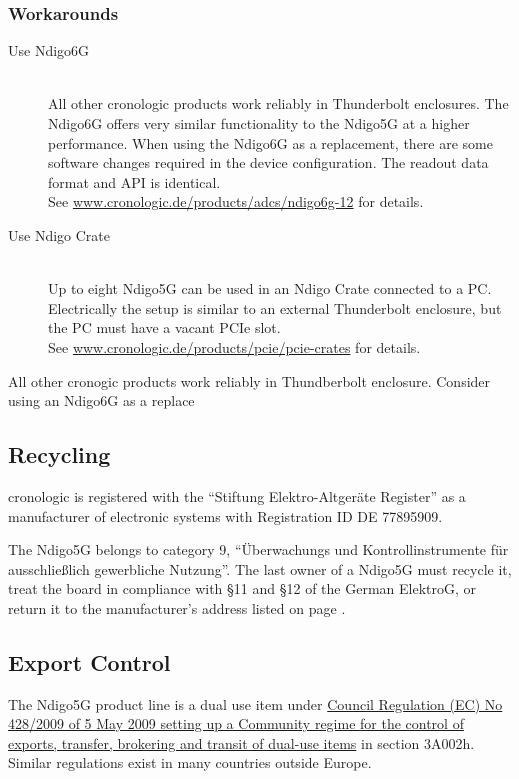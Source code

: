 	\subsubsection{Workarounds}
	\begin{description}
		\item[Use Ndigo6G]\hfill \\
			All other cronologic products work reliably in Thunderbolt enclosures. The Ndigo6G offers very similar functionality to the Ndigo5G at a higher performance. When using the Ndigo6G as a replacement, there are some software changes required in the device configuration. The readout data format and API is identical.\\
			See \href{https://www.cronologic.de/products/adcs/ndigo6g-12}{www.cronologic.de/products/adcs/ndigo6g-12} for details.
 
		\item[Use Ndigo Crate]\hfill \\
			Up to eight Ndigo5G can be used in an Ndigo Crate connected to a PC. Electrically the setup is similar to an external Thunderbolt enclosure, but the PC must have a vacant PCIe slot. \\
			See \href{https://www.cronologic.de/products/pcie/pcie-crates}{www.cronologic.de/products/pcie/pcie-crates} for details.
	\end{description}
	All other cronogic products work reliably in Thundberbolt enclosure. Consider using an Ndigo6G as a replace 

\subsection{Recycling}

	cronologic is registered with the ``Stiftung Elektro-Altger\"a{}te Register'' as a manufacturer of electronic systems with Registration ID DE 77895909.\par

	The Ndigo5G belongs to category 9, ``\"U{}berwachungs und Kontrollinstrumente f\"u{}r aus\-schlie\ss lich gewerbliche Nutzung''. The last owner of a Ndigo5G must recycle it, treat the board in compliance with \S{}11 and \S{}12 of the German ElektroG, or return it to the manufacturer's address listed on page \pageref{cp:manu}.
	
\subsection{Export Control}
The Ndigo5G product line is a dual use item under \href{https://data.europa.eu/eli/reg/2009/428/2021-10-077}{Council Regulation (EC) No 428/2009 of 5 May 2009 setting up a Community regime for the control of exports, transfer, brokering and transit of dual-use items} in section 3A002h. Similar regulations exist in many countries outside Europe.

